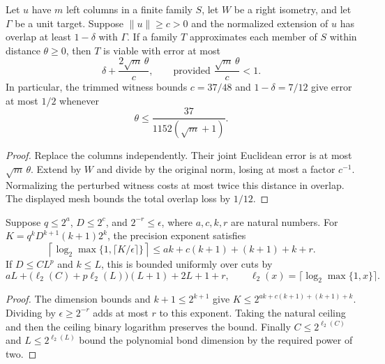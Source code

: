 \begin{lemma}
    \label{thm:lvv_subnormalized_column_rounding}
    \leanok
    Let $u$ have $m$ left columns in a finite family $S$, let $W$ be a right
    isometry, and let $\Gamma$ be a unit target. Suppose $\|u\|\ge c>0$
    and the normalized extension of $u$ has overlap at least $1-\delta$
    with $\Gamma$. If a family $T$ approximates each member of $S$ within
    distance $\theta\ge0$, then $T$ is viable with error at most
    \[
        \delta+\frac{2\sqrt m\,\theta}{c},
        \qquad \text{provided }\frac{\sqrt m\,\theta}{c}<1.
    \]
    In particular, the trimmed witness bounds $c=37/48$ and
    $1-\delta=7/12$ give error at most $1/2$ whenever
    \[
        \theta\le \frac{37}{1152(\sqrt m+1)}.
    \]
\end{lemma}
\begin{proof}\leanok
    Replace the columns independently. Their joint Euclidean error is at
    most $\sqrt m\,\theta$. Extend by $W$ and divide by the original
    norm, losing at most a factor $c^{-1}$. Normalizing the perturbed
    witness costs at most twice this distance in overlap. The displayed
    mesh bounds the total overlap loss by $1/12$.
\end{proof}

\begin{lemma}
    \label{thm:lvv_tensor_dyadic_precision}
    \leanok
    Suppose $q\le2^a$, $D\le2^c$, and $2^{-r}\le\epsilon$, where
    $a,c,k,r$ are natural numbers. For
    $K=q^kD^{k+1}(k+1)2^k$, the precision exponent satisfies
    \[
        \left\lceil\log_2\max\{1,\lceil K/\epsilon\rceil\}\right\rceil
        \le ak+c(k+1)+(k+1)+k+r.
    \]
    If $D\le CL^p$ and $k\le L$, this is bounded uniformly over cuts by
    \[
        aL+\bigl(\ell_2(C)+p\ell_2(L)\bigr)(L+1)+2L+1+r,
        \qquad \ell_2(x)=\lceil\log_2\max\{1,x\}\rceil.
    \]
\end{lemma}
\begin{proof}\leanok
    The dimension bounds and $k+1\le2^{k+1}$ give
    $K\le2^{ak+c(k+1)+(k+1)+k}$. Dividing by $\epsilon\ge2^{-r}$
    adds at most $r$ to this exponent. Taking the natural ceiling and
    then the ceiling binary logarithm preserves the bound.
    Finally $C\le2^{\ell_2(C)}$ and $L\le2^{\ell_2(L)}$ bound the
    polynomial bond dimension by the required power of two.
\end{proof}

